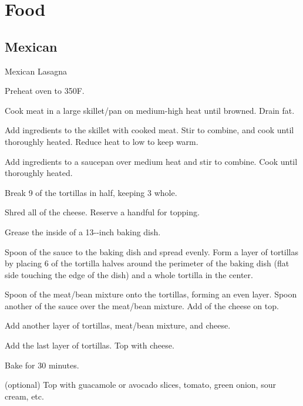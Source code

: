 \documentclass[]{article}
\begin{document}
\tableofcontents
\newpage


\section{Food}

\subsection{Mexican}

\begin{recipe}{Mexican Lasagna}{}{}
	
	
	Preheat oven to 350\0F.
	
	Cook meat in a large skillet/pan on medium-high heat until browned. Drain fat.
	
	Add ingredients to the skillet with cooked meat. Stir to combine, and cook until thoroughly heated. Reduce heat to low to keep warm.
	
	Add ingredients to a saucepan over medium heat and stir to combine. Cook until thoroughly heated. 
	
	Break 9 of the tortillas in half, keeping 3 whole.
	
	Shred all of the cheese. Reserve a handful for topping. 
	
	\newstep
	Grease the inside of a 13--inch baking dish.
	
	\newstep
	Spoon  of the sauce to the baking dish and spread evenly. Form a layer of tortillas by placing 6 of the tortilla halves around the perimeter of the baking dish (flat side touching the edge of the dish) and a whole tortilla in the center.
	
	\newstep
	Spoon  of the meat/bean mixture onto the tortillas, forming an even layer. Spoon another  of the sauce over the meat/bean mixture. Add  of the cheese on top.
	
	\newstep
	Add another layer of tortillas, meat/bean mixture, and cheese.
	
	\newstep
	Add the last layer of tortillas. Top with cheese.
	
	\newstep
	Bake for 30 minutes. 
	
	\newstep
	(optional) Top with guacamole or avocado slices, tomato, green onion, sour cream, etc.
	
\end{recipe}
\end{document}
